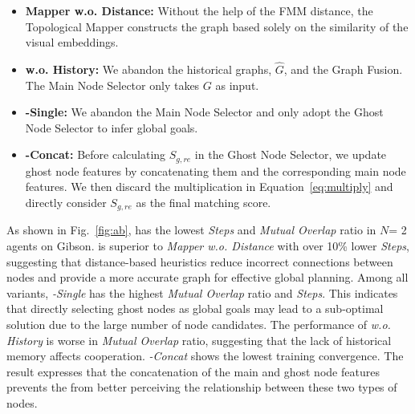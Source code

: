 \begin{itemize}
\setlength{\parskip}{0pt} \setlength{\itemsep}{0pt plus 1pt}
 \item \textbf{Mapper w.o. Distance: }Without the help of the FMM distance, the Topological Mapper constructs the graph based solely on the similarity of the visual embeddings. 
  \item \textbf{{\planner} w.o. History: }We abandon the historical graphs, $\hat{G}$, and the Graph Fusion. The Main Node Selector only takes $G$ as input.
 \item \textbf{{\planner}-Single: }We abandon the Main Node Selector and only adopt the Ghost Node Selector to infer global goals.
 \item \textbf{{\planner}-Concat: }Before calculating $S_{g, re}$ in the Ghost Node Selector, we update ghost node features by concatenating them and the corresponding main node features. We then discard the multiplication in Equation~\ref{eq:multiply} and directly consider $S_{g, re}$ as the final matching score.
 
\end{itemize}
\iffalse
\item \textbf{{\planner} w.o. GNN}: We replace GNN with Multi-Layer Perception to extract the relationship between different kinds of graphs in {\planner}.

  \item \textbf{{\planner}-Mean: }We replace GNN with mean operation to update the node features in the graphs and only implement GNN to calculate the weighted scores.
  \emph{{\planner}-Mean} results in the highest \emph{Mutual Overlap} ratio and \emph{Steps}, indicating that GNN infers probability distribution of different global goal candidates and can better capture the interactions among agents and topological map to encourage exploration efficiency and cooperation.
\fi

As shown in Fig.~\ref{fig:ab}, {\name} has the lowest \emph{Steps} and \emph{Mutual Overlap} ratio in $N$= 2 agents on Gibson. {\name} is superior to \emph{Mapper w.o. Distance} with over 10\% lower \emph{Steps}, suggesting that distance-based heuristics reduce incorrect connections between nodes and provide a more accurate graph for effective global planning.
Among all {\planner} variants, \emph{{\planner}-Single} has the highest \emph{Mutual Overlap} ratio and \emph{Steps}. This indicates that directly selecting ghost nodes as global goals may lead to a sub-optimal solution due to the large number of node candidates. The performance of \emph{{\planner} w.o. History} is worse in \emph{Mutual Overlap} ratio, suggesting that the lack of historical memory affects cooperation.
\emph{{\planner}-Concat} shows the lowest training convergence. The result expresses that the concatenation of the main and ghost node features prevents the {\planner} from better perceiving the relationship between these two types of nodes.

